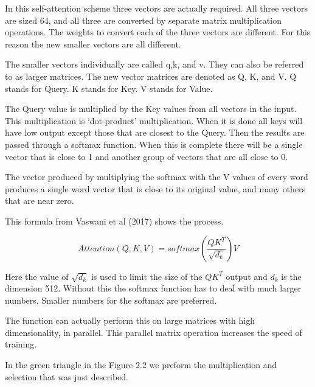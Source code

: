 In this self-attention scheme three vectors are actually required. All three vectors are sized 64, and all three are converted by separate matrix multiplication operations. The weights to convert each of the three vectors are different. For this reason the new smaller vectors are all different.

The smaller vectors individually are called q,k, and v. They can also be referred to as larger matrices. The new vector matrices are denoted as Q, K, and V. Q stands for Query. K stands for Key. V stands for Value. 

The Query value is multiplied by the Key values from all vectors in the input. This multiplication is `dot-product' multiplication. When it is done all keys will have low output except those that are closest to the Query. Then the results are passed through a softmax function. When this is complete there will be a single vector that is close to 1 and another group of vectors that are all close to 0.

The vector produced by multiplying the softmax with the V values of every word produces a single word vector that is close to its original value, and many others that are near zero.

This formula from Vaswani et al (2017)\cite{Vaswani2017AttentionIA} 
shows the process.

$$
Attention(Q,K,V)=softmax(\dfrac{QK^T}{\sqrt{d_k}})V
$$

Here the value of $\sqrt{d_k}$ is used to limit the size of the $QK^T$ output and $d_k$ is the dimension 512. Without this the softmax function has to deal with much larger numbers. Smaller numbers for the softmax are preferred. 

The function can actually perform this on large matrices with high dimensionality, in parallel. This parallel matrix operation increases the speed of training.

In the green triangle in the Figure 2.2 we preform the multiplication and selection that was just described.

